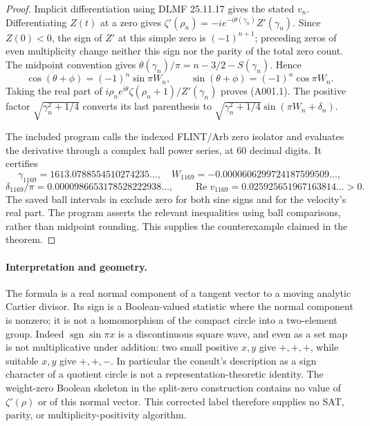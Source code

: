 \begin{proof}
Implicit differentiation using DLMF 25.11.17 gives the stated $v_n$.
Differentiating $Z(t)$ at a zero gives
$\zeta'(\rho_n)=-i e^{-i\theta(\gamma_n)}Z'(\gamma_n)$.
Since $Z(0)<0$, the sign of $Z'$ at this simple zero is
$(-1)^{n+1}$; preceding zeros of even multiplicity change neither this
sign nor the parity of the total zero count.  The midpoint convention
gives $\theta(\gamma_n)/\pi=n-3/2-S(\gamma_n)$.  Hence
\[
 \cos(\theta+\phi)=(-1)^n\sin\pi W_n,\qquad
 \sin(\theta+\phi)=(-1)^n\cos\pi W_n.
\]
Taking the real part of
$i\rho_n e^{i\theta}\zeta(\rho_n+1)/Z'(\gamma_n)$ proves (A001.1).
The positive factor $\sqrt{\gamma_n^2+1/4}$ converts its last parenthesis
to $\sqrt{\gamma_n^2+1/4}\sin(\pi W_n+\delta_n)$.

The included program  calls the indexed
FLINT/Arb zero isolator and evaluates the derivative through a complex
ball power series, at 60 decimal digits.  It certifies
\[
 \gamma_{1169}=1613.0788554510274235\ldots,\quad
 W_{1169}=-0.0000606299724187599509\ldots,
\]
\[
 \delta_{1169}/\pi=0.0000986653178528222938\ldots,
 \qquad \operatorname{Re}v_{1169}=0.025925651967163814\ldots>0.
\]
The saved ball intervals in  exclude zero
for both sine signs and for the velocity's real part.  The program asserts
the relevant inequalities using ball comparisons, rather than midpoint
rounding.  This supplies the counterexample claimed in the theorem.
\end{proof}

\paragraph{Interpretation and geometry.}
The formula is a real normal component of a tangent vector to a moving
analytic Cartier divisor.  Its sign is a Boolean-valued statistic where
the normal component is nonzero; it is not a homomorphism of the compact
circle into a two-element group.  Indeed $\operatorname{sgn}\sin\pi x$ is
a discontinuous square wave, and even as a set map is not multiplicative
under addition: two small positive $x,y$ give $+,+,+$, while suitable
$x,y$ give $+,+,-$.  In particular the consult's description as a sign
character of a quotient circle is not a representation-theoretic identity.
The weight-zero Boolean skeleton in the split-zero construction contains
no value of $\zeta'(\rho)$ or of this normal vector.  This corrected label
therefore supplies no SAT, parity, or multiplicity-positivity algorithm.

